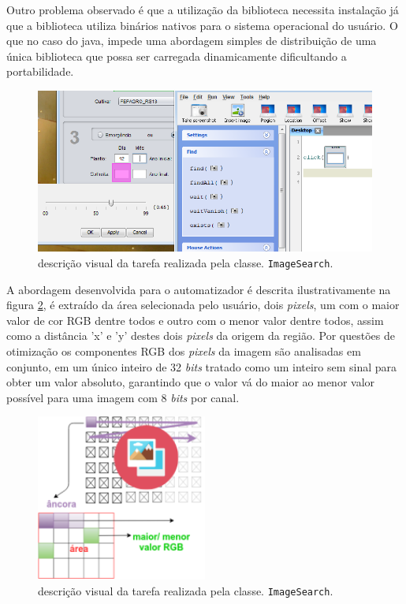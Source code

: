 \documentclass[tg]{mdtufsm}
\begin{document}
                    Outro problema observado é que a utilização da biblioteca necessita instalação já que a biblioteca utiliza binários nativos para o sistema operacional do usuário. O que no caso do java, impede uma abordagem simples de distribuição de uma única biblioteca que possa ser carregada dinamicamente dificultando a portabilidade.

                    \begin{figure}[!htb]
                        {\centering
                        \includegraphics[width=1.0\textwidth]{imagens/a.png}
                        \caption{descrição visual da tarefa realizada pela classe. \texttt{ImageSearch}.}
                        \label{fig:sikulixNoMatch}}
                    \end{figure}

                    A abordagem desenvolvida para o automatizador é descrita ilustrativamente na figura \ref{fig:ImageSearch}, é extraído da área selecionada pelo usuário, dois \emph{pixels}, um com o maior valor de cor RGB dentre todos e outro com o menor valor dentre todos, assim como a distância 'x' e 'y' destes dois \emph{pixels} da origem da região. Por questões de otimização os componentes RGB dos \emph{pixels} da imagem são analisadas em conjunto, em um único inteiro de 32 \emph{bits} tratado como um inteiro sem sinal para obter um valor absoluto, garantindo que o valor vá do maior ao menor valor possível para uma imagem com 8 \emph{bits} por canal.

                    \begin{figure}[!htb]
                        {\centering
                        \includegraphics[width=0.5\textwidth]{imagens/searchImage.png}
                        \caption{descrição visual da tarefa realizada pela classe. \texttt{ImageSearch}.}
                        \label{fig:ImageSearch}}
                    \end{figure}
\end{document}

